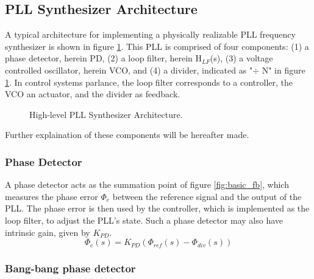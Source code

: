 	\subsection{PLL Synthesizer Architecture}
		A typical architecture for implementing a physically realizable PLL frequency synthesizer \cite{Razavi1996DesignOM} is shown in figure \ref{fig:basic_pll}. This PLL is comprised of four components: (1) a phase detector, herein PD, (2) a loop filter, herein H$_{LF}$(s), (3) a voltage controlled oscillator, herein VCO, and (4) a divider, indicated as "$\div$ N" in figure \ref{fig:basic_pll}. In control systems parlance, the loop filter corresponds to a controller, the VCO an actuator, and the divider as feedback.
		\begin{figure}[htb!]
			\center
			\caption{High-level PLL Synthesizer Architecture.}
			\label{fig:basic_pll}
		\end{figure}
		\FloatBarrier
		Further explaination of these components will be hereafter made.

		\subsubsection{Phase Detector}
		A phase detector acts as the summation point of figure \ref{fig:basic_fb}, which measures the phase error $\Phi_e$ between the reference signal and the output of the PLL. The phase error is then used by the controller, which is implemented as the loop filter, to adjust the PLL's state. Such a phase detector may also have intrinsic gain, given by $K_{PD}$.
		\begin{equation}
			\Phi_e(s) = K_{PD}(\Phi_{ref}(s) - \Phi_{div}(s))
		\end{equation}

		\subsubsection{Bang-bang phase detector}\label{bbpd_theory}

